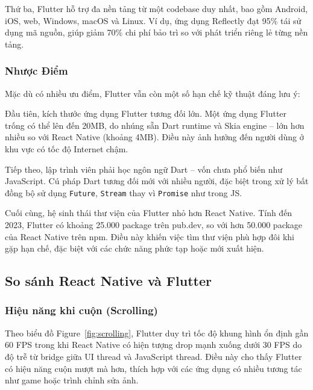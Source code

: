 Thứ ba, Flutter hỗ trợ đa nền tảng từ một codebase duy nhất, bao gồm Android, iOS, web, Windows, macOS và Linux.  
Ví dụ, ứng dụng Reflectly đạt 95\% tái sử dụng mã nguồn, giúp giảm 70\% chi phí bảo trì so với phát triển riêng lẻ từng nền tảng.

\subsubsection{Nhược Điểm}

\hspace*{1.5em}Mặc dù có nhiều ưu điểm, Flutter vẫn còn một số hạn chế kỹ thuật đáng lưu ý:

Đầu tiên, kích thước ứng dụng Flutter tương đối lớn.  
Một ứng dụng Flutter trống có thể lên đến 20MB, do nhúng sẵn Dart runtime và Skia engine – lớn hơn nhiều so với React Native (khoảng 4MB).  
Điều này ảnh hưởng đến người dùng ở khu vực có tốc độ Internet chậm.

Tiếp theo, lập trình viên phải học ngôn ngữ Dart – vốn chưa phổ biến như JavaScript.  
Cú pháp Dart tương đối mới với nhiều người, đặc biệt trong xử lý bất đồng bộ sử dụng \texttt{Future}, \texttt{Stream} thay vì \texttt{Promise} như trong JS.

Cuối cùng, hệ sinh thái thư viện của Flutter nhỏ hơn React Native.  
Tính đến 2023, Flutter có khoảng 25.000 package trên pub.dev, so với hơn 50.000 package của React Native trên npm.  
Điều này khiến việc tìm thư viện phù hợp đôi khi gặp hạn chế, đặc biệt với các chức năng phức tạp hoặc mới xuất hiện.

\subsection{So sánh React Native và Flutter}
\renewcommand{\labelitemi}{--}

\subsubsection{Hiệu năng khi cuộn (Scrolling)}
\begin{flushleft}
  \hspace*{0.8cm}Theo biểu đồ Figure~\ref{fig:scrolling}, Flutter duy trì tốc độ khung hình ổn định gần 60 FPS trong khi React Native có hiện tượng drop mạnh xuống dưới 30 FPS do độ trễ từ bridge giữa UI thread và JavaScript thread. Điều này cho thấy Flutter có hiệu năng cuộn mượt mà hơn, thích hợp với các ứng dụng có nhiều tương tác như game hoặc trình chỉnh sửa ảnh.
\end{flushleft}

